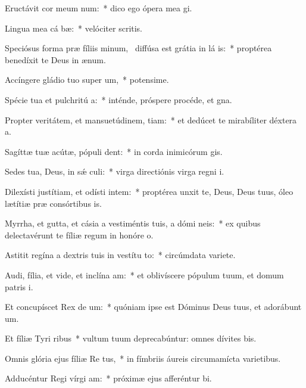 \item Eructávit cor meum  num:~* dico ego ópera mea gi.
\item Lingua mea cá bæ:~* velóciter scritis.
\item Speciósus forma præ fíliis minum,~\pscross{} diffúsa est grátia in lá is:~* proptérea benedíxit te Deus in ænum.
\item Accíngere gládio tuo super  um,~* potensime.
\item Spécie tua et pulchritú a:~* inténde, próspere procéde, et gna.
\item Propter veritátem, et mansuetúdinem,  tiam:~* et dedúcet te mirabíliter déxtera a.
\item Sagíttæ tuæ acútæ, pópuli   dent:~* in corda inimicórum gis.
\item Sedes tua, Deus, in sǽ culi:~* virga directiónis virga regni i.
\item Dilexísti justítiam, et odísti intem:~* proptérea unxit te, Deus, Deus tuus, óleo lætítiæ præ consórtibus is.
\item Myrrha, et gutta, et cásia a vestiméntis tuis, a dómi neis:~* ex quibus delectavérunt te fíliæ regum in honóre o.
\item Astitit regína a dextris tuis in vestítu to:~* circúmdata variete.
\item Audi, fília, et vide, et inclína  am:~* et oblivíscere pópulum tuum, et domum patris i.
\item Et concupíscet Rex de um:~* quóniam ipse est Dóminus Deus tuus, et adorábunt um.
\item Et fíliæ Tyri  ribus~* vultum tuum deprecabúntur: omnes dívites bis.
\item Omnis glória ejus fíliæ Re  tus,~* in fímbriis áureis circumamícta varietibus.
\item Adducéntur Regi vírgi  am:~* próximæ ejus afferéntur bi.
